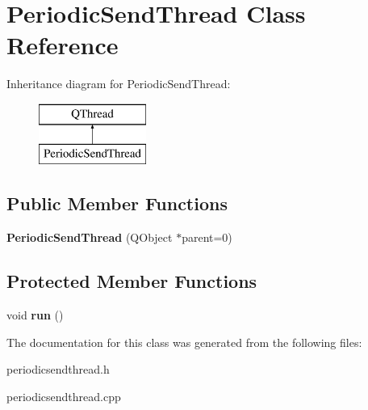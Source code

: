 \hypertarget{class_periodic_send_thread}{}\section{Periodic\+Send\+Thread Class Reference}
\label{class_periodic_send_thread}
Inheritance diagram for Periodic\+Send\+Thread\+:\begin{figure}[H]
\begin{center}
\leavevmode
\includegraphics[height=2.000000cm]{class_periodic_send_thread}
\end{center}
\end{figure}
\subsection*{Public Member Functions}
\begin{DoxyCompactItemize}
\item 
\hypertarget{class_periodic_send_thread_aa3fa8749bbaca64c2f3719ca93a21c19}{}{\bfseries Periodic\+Send\+Thread} (Q\+Object $\ast$parent=0)\label{class_periodic_send_thread_aa3fa8749bbaca64c2f3719ca93a21c19}

\end{DoxyCompactItemize}
\subsection*{Protected Member Functions}
\begin{DoxyCompactItemize}
\item 
\hypertarget{class_periodic_send_thread_a5b6043a739a2767167d44b3bd2a184ba}{}void {\bfseries run} ()\label{class_periodic_send_thread_a5b6043a739a2767167d44b3bd2a184ba}

\end{DoxyCompactItemize}


The documentation for this class was generated from the following files\+:\begin{DoxyCompactItemize}
\item 
periodicsendthread.\+h\item 
periodicsendthread.\+cpp\end{DoxyCompactItemize}

